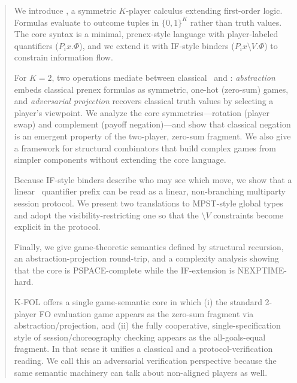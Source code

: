\begin{abstract}
We introduce \KFOL, a symmetric $K$-player calculus extending first-order logic. Formulas evaluate to outcome tuples in $\{0,1\}^K$ rather than truth values. The core syntax is a minimal, prenex-style language with player-labeled quantifiers ($P_i x.\Phi$), and we extend it with IF-style binders ($P_i x \setminus V.\Phi$) to constrain information flow.

For $K=2$, two operations mediate between classical \FOL\ and \KFOL: \emph{abstraction} embeds classical prenex formulas as symmetric, one-hot (zero-sum) games, and \emph{adversarial projection} recovers classical truth values by selecting a player's viewpoint. We analyze the core symmetries---rotation (player swap) and complement (payoff negation)---and show that classical negation is an emergent property of the two-player, zero-sum fragment. We also give a framework for structural combinators that build complex games from simpler components without extending the core language.

Because IF-style binders describe who may see which move, we show that a linear \KFOL\ quantifier prefix can be read as a linear, non-branching multiparty session protocol. We present two translations to MPST-style global types and adopt the visibility-restricting one so that the $\setminus V$ constraints become explicit in the protocol.

Finally, we give game-theoretic semantics defined by structural recursion, an abstraction-projection round-trip, and a complexity analysis showing that the core is PSPACE-complete while the IF-extension is NEXPTIME-hard.

K-FOL offers a single game-semantic core in which (i) the standard 2-player FO evaluation game appears as the zero-sum fragment via abstraction/projection, and (ii) the fully cooperative, single-specification style of session/choreography checking appears as the all-goals-equal fragment. In that sense it unifies a classical and a protocol-verification reading. We call this an adversarial verification perspective because the same semantic machinery can talk about non-aligned players as well.
\end{abstract}
